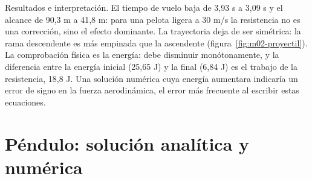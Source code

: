 \documentclass[10pt,openany]{book}
\begin{document}
Resultados e interpretación. El tiempo de vuelo baja de 3,93 s a 3,09 s y el alcance de 90,3 m a 41,8 m: para una pelota ligera a 30 m/s la resistencia no es una corrección, sino el efecto dominante. La trayectoria deja de ser simétrica: la rama descendente es más empinada que la ascendente (figura~\ref{fig:m02-proyectil}). La comprobación física es la energía: debe disminuir monótonamente, y la diferencia entre la energía inicial (25,65 J) y la final (6,84 J) es el trabajo de la resistencia, 18,8 J. Una solución numérica cuya energía aumentara indicaría un error de signo en la fuerza aerodinámica, el error más frecuente al escribir estas ecuaciones.

\section{Péndulo: solución analítica y numérica}
\end{document}
